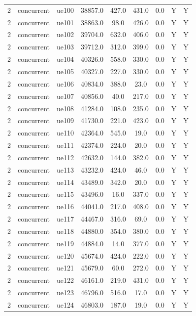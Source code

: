 \begin{table}[ht]
\begin{tabular}{|c|c|c|c|c|c|c|c|c|}
2 & concurrent & ue100 & 38857.0 & 427.0 & 431.0 & 0.0 & Y & Y \\
2 & concurrent & ue101 & 38863.0 & 98.0 & 426.0 & 0.0 & Y & Y \\
2 & concurrent & ue102 & 39704.0 & 632.0 & 406.0 & 0.0 & Y & Y \\
2 & concurrent & ue103 & 39712.0 & 312.0 & 399.0 & 0.0 & Y & Y \\
2 & concurrent & ue104 & 40326.0 & 558.0 & 330.0 & 0.0 & Y & Y \\
2 & concurrent & ue105 & 40327.0 & 227.0 & 330.0 & 0.0 & Y & Y \\
2 & concurrent & ue106 & 40834.0 & 388.0 & 23.0 & 0.0 & Y & Y \\
2 & concurrent & ue107 & 40856.0 & 40.0 & 217.0 & 0.0 & Y & Y \\
2 & concurrent & ue108 & 41284.0 & 108.0 & 235.0 & 0.0 & Y & Y \\
2 & concurrent & ue109 & 41730.0 & 221.0 & 423.0 & 0.0 & Y & Y \\
2 & concurrent & ue110 & 42364.0 & 545.0 & 19.0 & 0.0 & Y & Y \\
2 & concurrent & ue111 & 42374.0 & 224.0 & 20.0 & 0.0 & Y & Y \\
2 & concurrent & ue112 & 42632.0 & 144.0 & 382.0 & 0.0 & Y & Y \\
2 & concurrent & ue113 & 43232.0 & 424.0 & 46.0 & 0.0 & Y & Y \\
2 & concurrent & ue114 & 43489.0 & 342.0 & 20.0 & 0.0 & Y & Y \\
2 & concurrent & ue115 & 43496.0 & 16.0 & 337.0 & 0.0 & Y & Y \\
2 & concurrent & ue116 & 44041.0 & 217.0 & 408.0 & 0.0 & Y & Y \\
2 & concurrent & ue117 & 44467.0 & 316.0 & 69.0 & 0.0 & Y & Y \\
2 & concurrent & ue118 & 44880.0 & 354.0 & 380.0 & 0.0 & Y & Y \\
2 & concurrent & ue119 & 44884.0 & 14.0 & 377.0 & 0.0 & Y & Y \\
2 & concurrent & ue120 & 45674.0 & 424.0 & 222.0 & 0.0 & Y & Y \\
2 & concurrent & ue121 & 45679.0 & 60.0 & 272.0 & 0.0 & Y & Y \\
2 & concurrent & ue122 & 46161.0 & 219.0 & 431.0 & 0.0 & Y & Y \\
2 & concurrent & ue123 & 46796.0 & 516.0 & 17.0 & 0.0 & Y & Y \\
2 & concurrent & ue124 & 46803.0 & 187.0 & 19.0 & 0.0 & Y & Y \\

\end{tabular}
\end{table}
